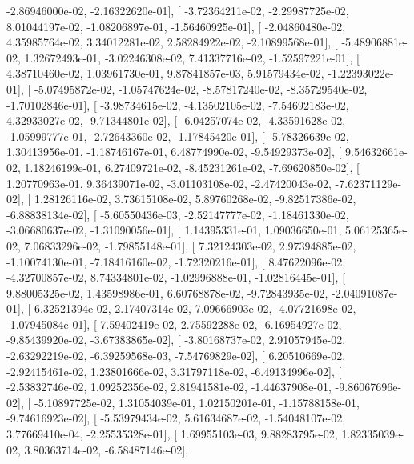 \documentclass{article}
\begin{document}
         -2.86946000e-02,  -2.16322620e-01],
       [ -3.72364211e-02,  -2.29987725e-02,   8.01044197e-02,
         -1.08206897e-01,  -1.56460925e-01],
       [ -2.04860480e-02,   4.35985764e-02,   3.34012281e-02,
          2.58284922e-02,  -2.10899568e-01],
       [ -5.48906881e-02,   1.32672493e-01,  -3.02246308e-02,
          7.41337716e-02,  -1.52597221e-01],
       [  4.38710460e-02,   1.03961730e-01,   9.87841857e-03,
          5.91579434e-02,  -1.22393022e-01],
       [ -5.07495872e-02,  -1.05747624e-02,  -8.57817240e-02,
         -8.35729540e-02,  -1.70102846e-01],
       [ -3.98734615e-02,  -4.13502105e-02,  -7.54692183e-02,
          4.32933027e-02,  -9.71344801e-02],
       [ -6.04257074e-02,  -4.33591628e-02,  -1.05999777e-01,
         -2.72643360e-02,  -1.17845420e-01],
       [ -5.78326639e-02,   1.30413956e-01,  -1.18746167e-01,
          6.48774990e-02,  -9.54929373e-02],
       [  9.54632661e-02,   1.18246199e-01,   6.27409721e-02,
         -8.45231261e-02,  -7.69620850e-02],
       [  1.20770963e-01,   9.36439071e-02,  -3.01103108e-02,
         -2.47420043e-02,  -7.62371129e-02],
       [  1.28126116e-02,   3.73615108e-02,   5.89760268e-02,
         -9.82517386e-02,  -6.88838134e-02],
       [ -5.60550436e-03,  -2.52147777e-02,  -1.18461330e-02,
         -3.06680637e-02,  -1.31090056e-01],
       [  1.14395331e-01,   1.09036650e-01,   5.06125365e-02,
          7.06833296e-02,  -1.79855148e-01],
       [  7.32124303e-02,   2.97394885e-02,  -1.10074130e-01,
         -7.18416160e-02,  -1.72320216e-01],
       [  8.47622096e-02,  -4.32700857e-02,   8.74334801e-02,
         -1.02996888e-01,  -1.02816445e-01],
       [  9.88005325e-02,   1.43598986e-01,   6.60768878e-02,
         -9.72843935e-02,  -2.04091087e-01],
       [  6.32521394e-02,   2.17407314e-02,   7.09666903e-02,
         -4.07721698e-02,  -1.07945084e-01],
       [  7.59402419e-02,   2.75592288e-02,  -6.16954927e-02,
         -9.85439920e-02,  -3.67383865e-02],
       [ -3.80168737e-02,   2.91057945e-02,  -2.63292219e-02,
         -6.39259568e-03,  -7.54769829e-02],
       [  6.20510669e-02,  -2.92415461e-02,   1.23801666e-02,
          3.31797118e-02,  -6.49134996e-02],
       [ -2.53832746e-02,   1.09252356e-02,   2.81941581e-02,
         -1.44637908e-01,  -9.86067696e-02],
       [ -5.10897725e-02,   1.31054039e-01,   1.02150201e-01,
         -1.15788158e-01,  -9.74616923e-02],
       [ -5.53979434e-02,   5.61634687e-02,  -1.54048107e-02,
          3.77669410e-04,  -2.25535328e-01],
       [  1.69955103e-03,   9.88283795e-02,   1.82335039e-02,
          3.80363714e-02,  -6.58487146e-02],
\end{document}
